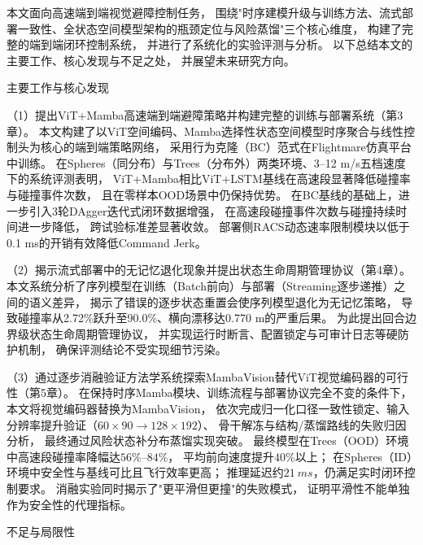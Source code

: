 

\begin{conclusion}

本文面向高速端到端视觉避障控制任务，
围绕"时序建模升级与训练方法、流式部署一致性、全状态空间模型架构的瓶颈定位与风险蒸馏"三个核心维度，
构建了完整的端到端闭环控制系统，
并进行了系统化的实验评测与分析。
以下总结本文的主要工作、核心发现与不足之处，
并展望未来研究方向。

主要工作与核心发现

（1）提出ViT+Mamba高速端到端避障策略并构建完整的训练与部署系统（第3章）。
本文构建了以ViT空间编码、Mamba选择性状态空间模型时序聚合与线性控制头为核心的端到端策略网络，
采用行为克隆（BC）范式在Flightmare仿真平台中训练。
在Spheres（同分布）与Trees（分布外）两类环境、3--12 m/s五档速度下的系统评测表明，
ViT+Mamba相比ViT+LSTM基线在高速段显著降低碰撞率与碰撞事件次数，
且在零样本OOD场景中仍保持优势。
在BC基线的基础上，进一步引入3轮DAgger迭代式闭环数据增强，
在高速段碰撞事件次数与碰撞持续时间进一步降低，
跨试验标准差显著收敛。
部署侧RACS动态速率限制模块以低于0.1 ms的开销有效降低Command Jerk。

（2）揭示流式部署中的无记忆退化现象并提出状态生命周期管理协议（第4章）。
本文系统分析了序列模型在训练（Batch前向）与部署（Streaming逐步递推）之间的语义差异，
揭示了错误的逐步状态重置会使序列模型退化为无记忆策略，
导致碰撞率从2.72\%跃升至90.0\%、横向漂移达0.770 m的严重后果。
为此提出回合边界级状态生命周期管理协议，
并实现运行时断言、配置锁定与可审计日志等硬防护机制，
确保评测结论不受实现细节污染。

（3）通过逐步消融验证方法学系统探索MambaVision替代ViT视觉编码器的可行性（第5章）。
在保持时序Mamba模块、训练流程与部署协议完全不变的条件下，
本文将视觉编码器替换为MambaVision，
依次完成归一化口径一致性锁定、输入分辨率提升验证（$60\times90 \rightarrow 128\times192$）、
骨干解冻与结构/蒸馏路线的失败归因分析，
最终通过风险状态补分布蒸馏实现突破。
最终模型在Trees（OOD）环境中高速段碰撞率降幅达$56\%$--$84\%$，
平均前向速度提升$40\%$以上；
在Spheres（ID）环境中安全性与基线可比且飞行效率更高；
推理延迟约$\SI{21}{ms}$，仍满足实时闭环控制要求。
消融实验同时揭示了"更平滑但更撞"的失败模式，
证明平滑性不能单独作为安全性的代理指标。

不足与局限性


\end{conclusion}
